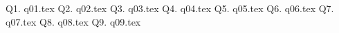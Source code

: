 

\newcommand\myincludetex[1]{\textbox{{\scriptsize \texttt{#1}}}

    
}

\newcommand\myincludesrc[1]{\textbox{{\scriptsize \texttt{#1}}}
    
    \VerbatimInput[fontsize=\footnotesize,frame=single]{#1}
}


\newpage Q1. {q01.tex}
\newpage Q2. {q02.tex}
\newpage Q3. {q03.tex}
\newpage Q4. {q04.tex}
\newpage Q5. {q05.tex}
\newpage Q6. {q06.tex}
\newpage Q7. {q07.tex}
\newpage Q8. {q08.tex}
\newpage Q9. {q09.tex}
\newpage 

    